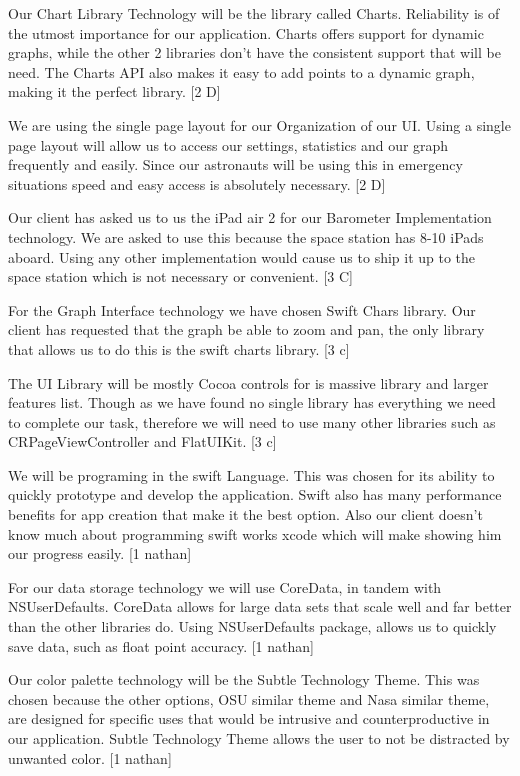 \documentclass[onecolumn, draftclsnofoot,10pt, compsoc]{IEEEtran}
\begin{document}
Our Chart Library Technology will be the library called Charts.
Reliability is of the utmost importance for our application.
Charts offers support for dynamic graphs, while the other 2 libraries don't have the consistent support that will be need.
The Charts API also makes it easy to add points to a dynamic graph, making it the perfect library. [2 D]

We are using the single page layout for our Organization of our UI.
Using a single page layout will allow us to access our settings, statistics and our graph frequently and easily.
Since our astronauts will be using this in emergency situations speed and easy access is absolutely necessary.  [2 D]

Our client has asked us to us the iPad air 2 for our Barometer Implementation technology.
We are asked to use this because the space station has 8-10 iPads aboard.
Using any other implementation would cause us to ship it up to the space station which is not necessary or convenient. [3 C]

For the Graph Interface technology we have chosen Swift Chars library.
Our client has requested that the graph be able to zoom and pan, the only library that allows us to do this is the swift charts library.  [3 c]

The UI Library will be mostly Cocoa controls for is massive library and larger features list.
Though as we have found no single library has everything we need to complete our task, therefore we will need to use many other libraries such as CRPageViewController and FlatUIKit. [3 c]


We will be programing in the swift Language.
This was chosen for its ability to quickly prototype and develop the application.
Swift also has many performance benefits for app creation that make it the best option.
Also our client doesn't know much about programming swift works xcode which will make showing him our progress easily. [1 nathan]

For our data storage technology we will use CoreData, in tandem with NSUserDefaults.
CoreData allows for large data sets that scale well and far better than the other libraries do.
Using NSUserDefaults package, allows us to quickly save data, such as float point accuracy. [1 nathan]

Our color palette technology will be the Subtle Technology Theme.
This was chosen because the other options, OSU similar theme and Nasa similar theme, are designed for specific uses that would be intrusive and counterproductive in our application.
Subtle Technology Theme allows the user to not be distracted by unwanted color.  [1 nathan]
\end{document}
